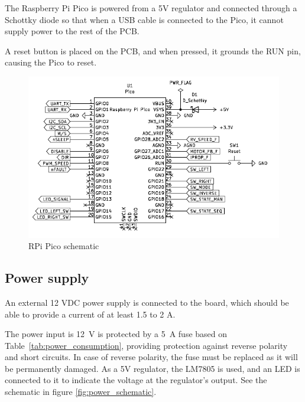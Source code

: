 The Raspberry Pi Pico is powered from a 5V regulator and connected through a Schottky diode so that when a USB cable is connected to the Pico, it cannot supply power to the rest of the PCB.

A reset button is placed on the PCB, and when pressed, it grounds the RUN pin, causing the Pico to reset.

\begin{figure}[h!]
    \centering
    \includegraphics[width=\textwidth]{images/pico_wiring.pdf}
    \caption{RPi Pico schematic}
    \label{fig:pico_wiring}
\end{figure}




\newpage
\subsection{Power supply}
An external 12 VDC power supply is connected to the board, which should be able to provide a current of at least 1.5 to 2 A.


The power input is 12~V is protected by a 5~A fuse based on Table~\ref{tab:power_consumption}, providing protection against reverse polarity and short circuits. In case of reverse polarity, the fuse must be replaced as it will be permanently damaged. As a 5V regulator, the LM7805 is used, and an LED is connected to it to indicate the voltage at the regulator's output. See the schematic in figure \ref{fig:power_schematic}.



